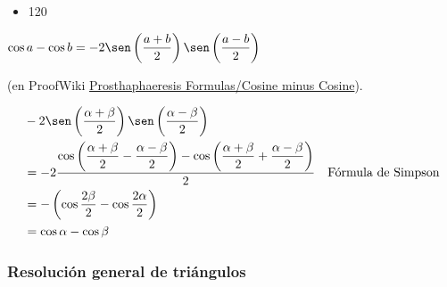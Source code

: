 \documentclass[11pt]{article}
\begin{document}
\begin{itemize}
\begin{itemize}
\item 120
\end{itemize}
\begin{teorema}
\(\cos a  - \cos b  =
  -2\sen\left(\dfrac{a+b}{2}\right)\sen\left(\dfrac{a-b}{2}\right)\)
\end{teorema}
\begin{demostracion}
(en ProofWiki \href{https://proofwiki.org/wiki/Prosthaphaeresis\_Formulas/Cosine\_minus\_Cosine}{Prosthaphaeresis Formulas/Cosine minus Cosine}).

\begin{align*}
  &  -2 \sen\left(\dfrac{\alpha+\beta}{2}\right)
        \sen\left(\dfrac{\alpha-\beta}{2}\right) \\
  &= -2 \dfrac{\cos\left(\dfrac{\alpha+\beta}{2} - \dfrac{\alpha-\beta}{2}\right) -
               \cos\left(\dfrac{\alpha+\beta}{2} + \dfrac{\alpha-\beta}{2}\right)}
             {2}
       & \mbox{Fórmula de Simpson} \\
  &= -\left(\cos \frac{2\beta}{2} - \cos \frac{2\alpha}{2}\right) \\
  &= \cos \alpha - \cos \beta \\
\end{align*}
\end{demostracion}
\end{itemize}

\subsubsection{Resolución general de triángulos}
\label{sec:orgc13c1d7}
\end{document}
